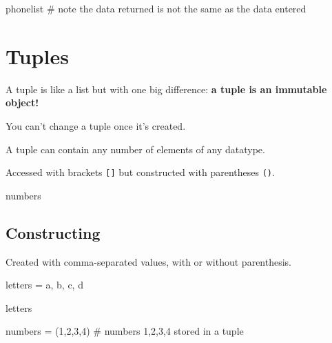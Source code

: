 \documentclass[
  letterpaper,
  DIV=11,
  numbers=noendperiod]{scrreprt}
\newenvironment{Shaded}{\begin{snugshade}}{\end{snugshade}}
\newcommand{\CommentTok}[1]{\textcolor[rgb]{0.37,0.37,0.37}{#1}}
\newcommand{\DecValTok}[1]{\textcolor[rgb]{0.68,0.00,0.00}{#1}}
\newcommand{\NormalTok}[1]{\textcolor[rgb]{0.00,0.23,0.31}{#1}}
\newcommand{\OperatorTok}[1]{\textcolor[rgb]{0.37,0.37,0.37}{#1}}
\newcommand{\StringTok}[1]{\textcolor[rgb]{0.13,0.47,0.30}{#1}}
\begin{document}
\begin{Shaded}
\begin{Highlighting}[]
\NormalTok{phonelist }\CommentTok{\# note the data returned is not the same as the data entered}
\end{Highlighting}
\end{Shaded}

\hypertarget{tuples}{%
\chapter{Tuples}\label{tuples}}

A tuple is like a list but with one big difference: \textbf{a tuple is
an immutable object!}

You can't change a tuple once it's created.

A tuple can contain any number of elements of any datatype.

Accessed with brackets \texttt{{[}{]}} but constructed with parentheses
\texttt{()}.

\begin{Shaded}
\begin{Highlighting}[]
\NormalTok{numbers}
\end{Highlighting}
\end{Shaded}

\hypertarget{constructing-2}{%
\section{Constructing}\label{constructing-2}}

Created with comma-separated values, with or without parenthesis.

\begin{Shaded}
\begin{Highlighting}[]
\NormalTok{letters }\OperatorTok{=} \StringTok{\textquotesingle{}a\textquotesingle{}}\NormalTok{, }\StringTok{\textquotesingle{}b\textquotesingle{}}\NormalTok{, }\StringTok{\textquotesingle{}c\textquotesingle{}}\NormalTok{, }\StringTok{\textquotesingle{}d\textquotesingle{}}
\end{Highlighting}
\end{Shaded}

\begin{Shaded}
\begin{Highlighting}[]
\NormalTok{letters}
\end{Highlighting}
\end{Shaded}

\begin{Shaded}
\begin{Highlighting}[]
\NormalTok{numbers }\OperatorTok{=}\NormalTok{ (}\DecValTok{1}\NormalTok{,}\DecValTok{2}\NormalTok{,}\DecValTok{3}\NormalTok{,}\DecValTok{4}\NormalTok{) }\CommentTok{\# numbers 1,2,3,4 stored in a tuple}
\end{Highlighting}
\end{Shaded}
\end{document}
